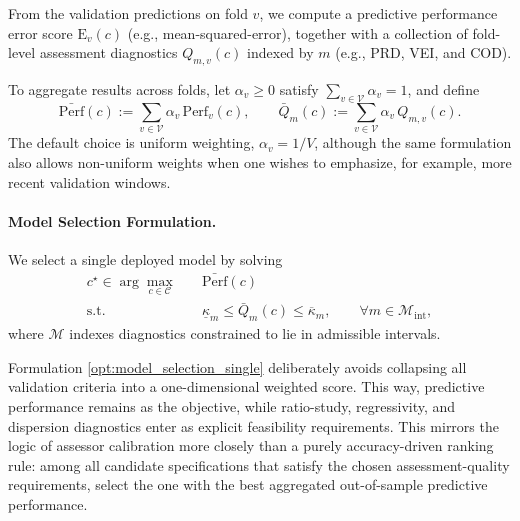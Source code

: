 \documentclass[12pt, draft]{article}
\theoremstyle{plain}
\theoremstyle{definition}
\newcommand{\1}{\mathbf{1}}
\begin{document}
From the validation predictions on fold $v$, we compute a predictive performance error score $\mathrm{E}_v(c)$ (e.g., mean-squared-error), together with a collection of fold-level assessment diagnostics $Q_{m,v}(c)$ indexed by $m$ (e.g., PRD, VEI, and COD). 


To aggregate results across folds, let $\alpha_v\ge 0$ satisfy $\sum_{v\in\mathcal V}\alpha_v=1$, and define
\[
\bar{\mathrm{Perf}}(c):=\sum_{v\in\mathcal V}\alpha_v\,\mathrm{Perf}_v(c),
\qquad
\bar Q_m(c):=\sum_{v\in\mathcal V}\alpha_v\,Q_{m,v}(c).
\]
The default choice is uniform weighting, $\alpha_v=1/V$, although the same formulation also allows non-uniform weights when one wishes to emphasize, for example, more recent validation windows.


\paragraph{Model Selection Formulation.} 
We select a single deployed model by solving
\begin{align}
    \label{opt:model_selection_single}
    c^\star
    \in
    \arg\max_{c\in\mathcal C}
    \quad
    & \bar{\mathrm{Perf}}(c)
    \\
    \text{s.t.}\quad
    & \underline{\kappa}_m \le \bar Q_m(c) \le \overline{\kappa}_m,
    \qquad \forall m\in\mathcal M_{\mathrm{int}},
    \nonumber
\end{align}
where $\mathcal M$ indexes diagnostics constrained to lie in admissible intervals.

Formulation \eqref{opt:model_selection_single} deliberately avoids collapsing all validation criteria into a one-dimensional weighted score. This way, predictive performance remains as the objective, while ratio-study, regressivity, and dispersion diagnostics enter as explicit feasibility requirements. This mirrors the logic of assessor calibration more closely than a purely accuracy-driven ranking rule: among all candidate specifications that satisfy the chosen assessment-quality requirements, select the one with the best aggregated out-of-sample predictive performance.
\end{document}
